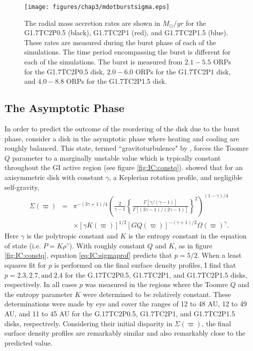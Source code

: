 \begin{figure}[p]
\centering
\texttt{[image: figures/chap3/mdotburstsigma.eps]}
\caption[Burst mass accretion rates for different initial surface density profiles]{The radial mass accretion rates are shown in $M_\odot/yr$ for the G1.7TC2P0.5 (black), G1.7TC2P1 (red), and G1.7TC2P1.5 (blue). These rates are measured during the burst phase of each of the simulations. The time period encompassing the burst is different for each of the simulations. The burst is measured from $2.1-5.5$ ORPs for the G1.7TC2P0.5 disk, $2.0-6.0$ ORPs for the G1.7TC2P1 disk, and $4.0-8.8$ ORPs for the G1.7TC2P1.5 disk.}
\label{fig:IC:mdots}
\end{figure}

\subsection{The Asymptotic Phase}

In order to predict the outcome of the reordering of the disk due to the burst phase, consider a disk in the asymptotic phase where heating and cooling are roughly balanced. This state, termed ``gravitoturbulence" by \citet{gammie2001}, forces the Toomre $Q$ parameter to a marginally unstable value which is typically constant throughout the GI active region (see figure \ref{fig:IC:constq}). \citet{boley2008} showed that for an axisymmetric disk with constant $\gamma$, a Keplerian rotation profile, and negligible self-gravity,
\begin{eqnarray*}
\Sigma(\varpi) &=& \pi^{-\left(3\gamma+1\right)/4}\left(\frac{2}{\gamma-1}\left\{\frac{\Gamma\left[\gamma/\left(\gamma-1\right)\right]}{\Gamma\left[\left(3\gamma-1\right)/\left(2\gamma-1\right)\right]}\right\}^2\right)^{\left(1-\gamma\right)/4}\\
&&\times[\gamma K(\varpi)]^{1/2}[GQ(\varpi)]^{-(\gamma+1)/2}\Omega (\varpi)^\gamma.
\label{eq:IC:sigmaprof}
\end{eqnarray*}
Here $\gamma$ is the polytropic constant and $K$ is the entropy constant in the equation of state (i.e. $P = K\rho^\gamma$). With roughly constant $Q$ and $K$, as in figure \ref{fig:IC:constq}, equation \eqref{eq:IC:sigmaprof} predicts that $p = 5/2$. When a least squares fit for $p$ is performed on the final surface density profiles, I find that $p = 2.3, 2.7,\mathrm{and}~ 2.4$ for the G.17TC2P0.5, G1.7TC2P1, and G1.7TC2P1.5 disks, respectively. In all cases $p$ was measured in the regions where the Toomre $Q$ and the entropy parameter $K$ were determined to be relatively constant. These determinations were made by eye and cover the ranges of 12 to 48 AU, 12 to 49 AU, and 11 to 45 AU for the G.17TC2P0.5, G1.7TC2P1, and G1.7TC2P1.5 disks, respectively. Considering their initial disparity in $\Sigma(\varpi)$, the final surface density profiles are remarkably similar and also remarkably close to the predicted value.

